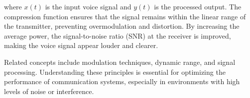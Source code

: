 where \( x(t) \) is the input voice signal and \( y(t) \) is the processed output. The compression function ensures that the signal remains within the linear range of the transmitter, preventing overmodulation and distortion. By increasing the average power, the signal-to-noise ratio (SNR) at the receiver is improved, making the voice signal appear louder and clearer.

Related concepts include modulation techniques, dynamic range, and signal processing. Understanding these principles is essential for optimizing the performance of communication systems, especially in environments with high levels of noise or interference.

